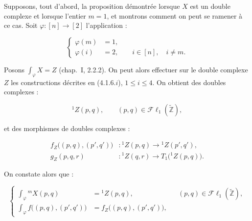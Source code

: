 \clearpage
{}%
\begingroup\small\setlength{\parskip}{0pt}\setlength{\emergencystretch}{1.5em}
\setlength{\abovedisplayskip}{4pt plus 2pt minus 2pt}%
\setlength{\belowdisplayskip}{4pt plus 2pt minus 2pt}%

Supposons, tout d'abord, la proposition démontrée lorsque $X$ est un double
complexe et lorsque l'entier $m=1$, et montrons comment on peut se ramener
à ce cas. Soit $\varphi\colon[n]\longrightarrow[2]$ l'application :

\begin{equation}
\left\{
\begin{aligned}
\varphi(m)&=1,\\
\varphi(i)&=2,\qquad i\in[n],\quad i\neq m.
\end{aligned}
\right.
\tag{4.1.7.1}
\end{equation}

Posons $\int_\varphi X=Z$ (chap.~I, 2.2.2). On peut alors effectuer sur le
double complexe $Z$ les constructions décrites en (4.1.6.$i$),
$1\leq i\leq4$. On obtient des doubles complexes :

\begin{equation}
{}^{1}\!Z(p,q),\qquad
(p,q)\in\mathcal{F}\ell_1(\widetilde{\mathbb Z}),
\tag{4.1.7.2}
\end{equation}

et des morphismes de doubles complexes :

\begin{equation}
\begin{aligned}
f_Z\bigl((p,q),(p',q')\bigr)&\colon
{}^{1}\!Z(p,q)\longrightarrow{}^{1}\!Z(p',q'),\\
g_Z(p,q,r)&\colon
{}^{1}\!Z(q,r)\longrightarrow T_1\bigl({}^{1}\!Z(p,q)\bigr).
\end{aligned}
\tag{4.1.7.3}
\end{equation}

On constate alors que :

\begin{equation}
\left\{
\begin{aligned}
\int_\varphi{}^{m}\!X(p,q)
  &={}^{1}\!Z(p,q),
  &&(p,q)\in\mathcal{F}\ell_1(\widetilde{\mathbb Z}),\\
\int_\varphi f\bigl((p,q),(p',q')\bigr)
  &=f_Z\bigl((p,q),(p',q')\bigr),
\end{aligned}
\right.
\tag{4.1.7.4}
\end{equation}

